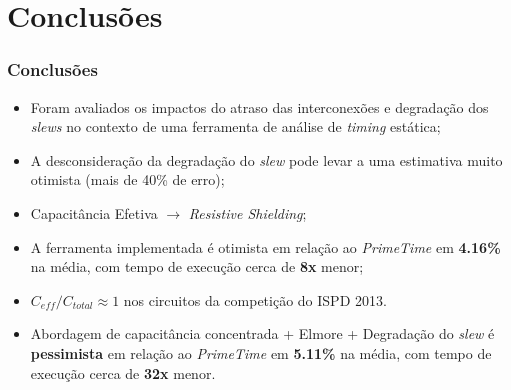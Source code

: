 \documentclass[10pt,a4paper]{beamer}
\begin{document}
	
	\section{Conclusões}
	
		\begin{frame}[t]
		\frametitle{Conclusões}
			\begin{itemize}
				\item Foram avaliados os impactos do atraso das interconexões e degradação dos \textit{slews} no contexto de uma ferramenta de análise de \textit{timing} estática;			
			
				\item A desconsideração da degradação do \textit{slew} pode levar a uma estimativa muito otimista (mais de 40\% de erro);
				
				\item Capacitância Efetiva $\to$ \textit{Resistive Shielding};
				
				\item A ferramenta implementada é otimista em relação ao \textit{PrimeTime} em \textbf{4.16\%} na média, com tempo de execução  cerca de \textbf{8x} menor;
				
				\item $C_{eff} / C_{total} \approx 1$ nos circuitos da competição do ISPD 2013.
				
				\item Abordagem de capacitância concentrada + Elmore + Degradação do \textit{slew} é \textbf{pessimista} em relação ao \textit{PrimeTime} em \textbf{5.11\%} na média, com tempo de execução cerca de \textbf{32x} menor.
			\end{itemize}
		\end{frame}
	
%		
%				
%				
		
	\section*{}
	\frame{\titlepage}
	
\end{document}
